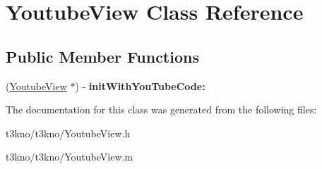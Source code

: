 \hypertarget{interface_youtube_view}{\section{Youtube\-View Class Reference}
\label{interface_youtube_view}
}
\subsection*{Public Member Functions}
\begin{DoxyCompactItemize}
\item 
\hypertarget{interface_youtube_view_ab7ae4cd7f09d0481d21b214c1c2f5f25}{(\hyperlink{interface_youtube_view}{Youtube\-View} $\ast$) -\/ {\bfseries init\-With\-You\-Tube\-Code\-:}}\label{interface_youtube_view_ab7ae4cd7f09d0481d21b214c1c2f5f25}

\end{DoxyCompactItemize}


The documentation for this class was generated from the following files\-:\begin{DoxyCompactItemize}
\item 
t3kno/t3kno/Youtube\-View.\-h\item 
t3kno/t3kno/Youtube\-View.\-m\end{DoxyCompactItemize}
